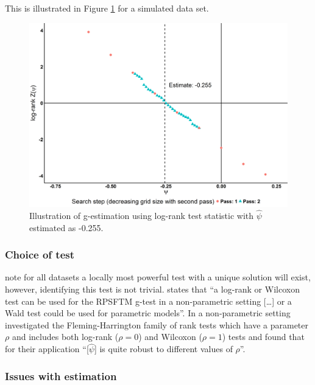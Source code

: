 This is illustrated in Figure \ref{F:C2:demo_g_est} for a simulated data set.
\begin{figure}[ht]
\centering
\includegraphics[width=13cm]{images/chap_methrev/example_g_est.png}
\caption{\label{F:C2:demo_g_est} Illustration of g-estimation using log-rank test statistic with $\hat{\psi}$ estimated as -0.255.} 
\end{figure}

\label{S:chap_methrev:RPSFTfit}

\subsubsection{Choice of test}

\cite{Robins1991} note for all datasets a locally most powerful test with a unique solution will exist, however, identifying this test is not trivial. \cite{TSD16} states that ``a log-rank or Wilcoxon test can be used for the RPSFTM g-test in a non-parametric setting [\ldots] or a Wald test could be used for parametric models''. In a non-parametric setting \cite{KorhonenRECORD} investigated the Fleming-Harrington family of rank tests which have a parameter $\rho$ and includes both log-rank ($\rho=0$) and Wilcoxon ($\rho=1$) tests and found that for their application ``[$\hat{\psi}$] is quite robust to different values of $\rho$''. 

\subsubsection{Issues with estimation}


